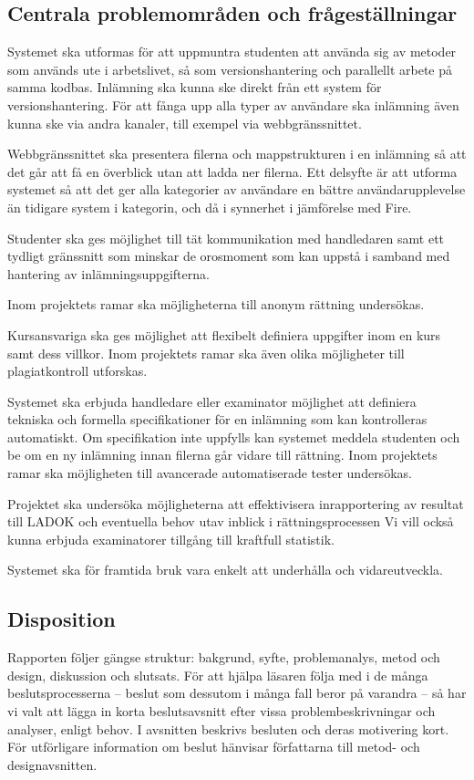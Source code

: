 \subsection{Centrala problemområden och frågeställningar}
Systemet ska utformas för att uppmuntra studenten att använda sig av metoder som
används ute i arbetslivet, så som versionshantering och parallellt arbete på
samma kodbas. Inlämning ska kunna ske direkt från ett system för
versionshantering. För att fånga upp alla typer av användare ska inlämning även
kunna ske via andra kanaler, till exempel via webbgränssnittet.

Webbgränssnittet ska presentera filerna och mappstrukturen i en inlämning så att
det går att få en överblick utan att ladda ner filerna.
Ett delsyfte är att utforma systemet så att det ger alla kategorier av användare
en bättre användarupplevelse än tidigare system i kategorin, och då i synnerhet
i jämförelse med Fire.

Studenter ska ges möjlighet till tät kommunikation med handledaren samt ett
tydligt gränssnitt som minskar de orosmoment som kan uppstå i samband med
hantering av inlämningsuppgifterna.

Inom projektets ramar ska möjligheterna till anonym rättning undersökas.

Kursansvariga ska ges möjlighet att flexibelt definiera uppgifter inom en kurs
samt dess villkor. 
Inom projektets ramar ska även olika möjligheter till plagiatkontroll utforskas.

Systemet ska erbjuda handledare eller examinator möjlighet att definiera
tekniska och formella specifikationer för en inlämning som kan kontrolleras
automatiskt. Om specifikation inte uppfylls kan systemet meddela studenten och
be om en ny inlämning innan filerna går vidare till rättning. Inom projektets
ramar ska möjligheten till avancerade automatiserade tester undersökas.

Projektet ska undersöka möjligheterna att effektivisera inrapportering av
resultat till LADOK och eventuella behov utav inblick i rättningsprocessen Vi
vill också kunna erbjuda examinatorer tillgång till kraftfull statistik.

Systemet ska för framtida bruk vara enkelt att underhålla och vidareutveckla.

\subsection{Disposition}

Rapporten följer gängse struktur: bakgrund, syfte, problemanalys, metod och
design, diskussion och slutsats. För att hjälpa läsaren följa med i de många
beslutsprocesserna – beslut som dessutom i många fall beror på varandra – så har
vi valt att lägga in korta beslutsavsnitt efter vissa  problembeskrivningar och
analyser, enligt behov. I avsnitten beskrivs besluten och deras motivering kort.
För utförligare information om beslut hänvisar författarna till metod- och
designavsnitten.

